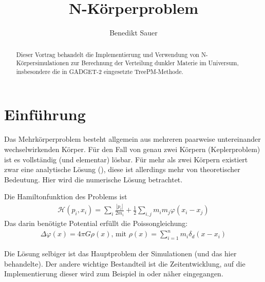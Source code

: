 \documentclass[a4paper]{scrartcl}
\author{Benedikt Sauer}
\title{N-Körperproblem}
\begin{document}
\maketitle
\begin{abstract}
  Dieser Vortrag behandelt die Implementierung und Verwendung von
  N-Körpersimulationen zur Berechnung der Verteilung dunkler Materie im
  Universum, insbesondere die in GADGET-2 eingesetzte TreePM-Methode.
\end{abstract}
\section{Einführung}
Das Mehrkörperproblem besteht allgemein aus mehreren paarweise untereinander
wechselwirkenden Körper. Für den Fall von genau zwei Körpern (Keplerproblem) ist
es vollständig (und elementar) lösbar. Für mehr als zwei Körpern existiert zwar
eine analytische Lösung (\cite{wang}), diese ist allerdings mehr von
theoretischer Bedeutung. Hier wird die numerische Lösung betrachtet.

Die Hamiltonfunktion des Problems ist
\begin{align}
  \mathcal{H}(p_i, x_i) = \sum_i \frac{\left|p_i\right|}{2m_i} +
  \frac{1}{2} \sum_{i,j} m_i m_j \varphi(x_i - x_j)
  \label{eq:hamilton}
\end{align}
Das darin benötigte Potential erfüllt die Poissongleichung:
\begin{align}
  \Delta \varphi(x) = 4\pi G \rho(x)\text{, mit }\rho(x) = \sum_{i=1}^n m_i
  \delta_d(x - x_i)
  \label{eq:poisson}
\end{align}

Die Lösung selbiger ist das Hauptproblem der Simulationen (und das hier
behandelte). Der andere wichtige Bestandteil ist die Zeitentwicklung, auf die
Implementierung dieser wird zum Beispiel in \cite{time-evo} oder
\cite{time-evo2} näher eingegangen.
\end{document}
